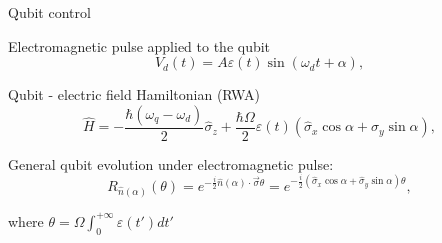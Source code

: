 \documentclass[aspectratio=169,10pt]{beamer}
\begin{document}
\begin{frame}{Qubit control}

  Electromagnetic pulse applied to the qubit
  \begin{equation*}
    V_d(t) = A\varepsilon(t)\sin{(\omega_d t + \alpha)},
  \end{equation*}

  Qubit - electric field Hamiltonian (RWA)
  \begin{equation*}
    \hat{H} = -\frac{\hbar (\omega_q - \omega_d)}{2} \hat{\sigma}_z + \frac{\hbar \Omega}{2} \varepsilon(t) \left( \hat{\sigma}_x \cos \alpha + \hat{\sigma}_y \sin \alpha \right),
  \end{equation*}

  General qubit evolution under electromagnetic pulse:
  \begin{equation*}
    R_{\hat{n}(\alpha)}(\theta) = e^{-\frac{i}{2} \hat{n}(\alpha) \cdot \vec{\sigma} \theta} = e^{-\frac{i}{2} (\hat{\sigma}_x \cos \alpha + \hat{\sigma}_y \sin \alpha) \theta},
  \end{equation*}

  where $\theta = \Omega\int_{0}^{+\infty}\varepsilon(t')dt'$

\end{frame}
\end{document}
